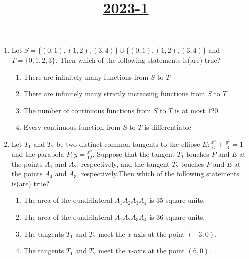 \documentclass[12pt,a4paper]{article}
\begin{document}
\title{\underline{\textbf{2023-1}}}
\maketitle
\begin{enumerate}
\item Let $S = \{(0,1), (1,2), (3,4)\} \cup \{(0,1), (1,2), (3,4)\}$ and $T = \{0, 1, 2, 3\}$. Then which of the following statements is(are) true?
\begin{enumerate}
\item There are infinitely many functions from $S$ to $T$  
\item There are infinitely many strictly increasing functions from $S$ to $T$  
\item The number of continuous functions from $S$ to $T$ is at most $120$  
\item Every continuous function from $S$ to $T$ is differentiable  
\end{enumerate}

\item Let $T_1$ and $T_2$ be two distinct common tangents to the ellipse $E: \frac{x^2}{6} + \frac{y^2}{3} = 1 $and the parabola $P: y = \frac{x^2}{12}.$ Suppose that the tangent $T_1$ touches $P$ and $E$ at the points $A_1$ and $A_2$, respectively, and the tangent $T_2$ touches $P$ and $E$ at the points $A_4$ and $A_3$, respectively.Then which of the following statements is(are) true?
\begin{enumerate}
\item The area of the quadrilateral $A_1A_2A_3A_4$ is $35$ square units.  
\item The area of the quadrilateral $A_1A_2A_3A_4$ is $36$ square units.  
\item The tangents $T_1$ and $T_2$ meet the $x$-axis at the point $(-3,0)$.  
\item The tangents $T_1$ and $T_2$ meet the $x$-axis at the point $(6,0)$.  
\end{enumerate}


\end{enumerate}
\end{document}
